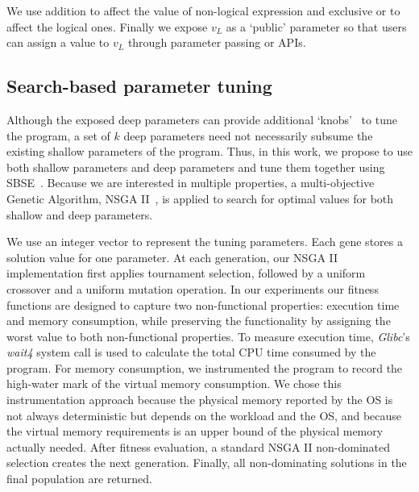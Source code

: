 We use addition to affect the value of non-logical expression and exclusive or to affect the logical ones.
Finally we expose $v_L$ as a `public' parameter so that users can assign a value to $v_L$ through parameter passing or APIs.

\subsection{Search-based parameter tuning}
\label{sec_nsgaii}

Although the exposed deep parameters can provide additional `knobs'~\cite{Hoffmann:2011:DKR:1950365.1950390} to tune the program, a set of $k$ deep parameters need not necessarily subsume the existing shallow parameters of the program.  Thus, in this work, we propose to use both shallow parameters and deep parameters and tune them together using SBSE~\cite{Harman:2007:CSF:1253532.1254729}. Because we are interested in multiple properties, a multi-objective Genetic Algorithm, NSGA II~\cite{996017}, is applied to search for optimal values for both shallow and deep parameters.

We use an integer vector to represent the tuning parameters. Each gene stores a solution value for one parameter. At each generation, our NSGA II implementation first applies tournament selection, followed by a uniform crossover and a uniform mutation operation. In our experiments our fitness functions are designed to capture two non-functional properties: execution time and memory consumption, while preserving the functionality by assigning the worst value to both non-functional properties. To measure execution time, \emph{Glibc}'s \emph{wait4} system call is used to calculate the total CPU time consumed by the program. For memory consumption, we instrumented the program to record the high-water mark of the virtual memory consumption. We chose this instrumentation approach because the physical memory reported by the OS is not always deterministic but depends on the workload and the OS, and because the virtual memory requirements is an upper bound of the physical memory actually needed. After fitness evaluation, a standard NSGA II non-dominated selection creates the next generation. Finally, all non-dominating solutions in the final population are returned.
